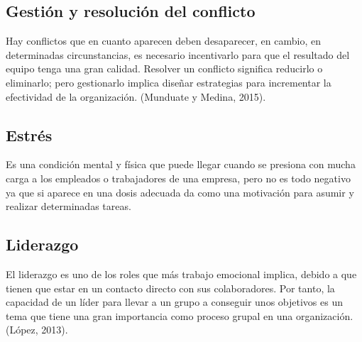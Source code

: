 \subsection{Gestión y resolución del conflicto}
Hay conflictos que en cuanto aparecen deben desaparecer, en cambio, en
determinadas circunstancias, es necesario incentivarlo para que el resultado del
equipo tenga una gran calidad. Resolver un conflicto significa reducirlo o
eliminarlo; pero gestionarlo implica diseñar estrategias para incrementar la
efectividad de la organización. (Munduate y Medina, 2015).
\subsection{Estrés}
Es una condición mental y física que puede llegar cuando se presiona con mucha
carga a los empleados o trabajadores de una empresa, pero no es todo negativo ya
que si aparece en una dosis adecuada da como una motivación para asumir y
realizar determinadas tareas.
\subsection{Liderazgo}
El liderazgo es uno de los roles que más trabajo emocional implica, debido a que
tienen que estar en un contacto directo con sus colaboradores. Por tanto, la
capacidad de un líder para llevar a un grupo a conseguir unos objetivos es un
tema que tiene una gran importancia como proceso grupal en una organización.
(López, 2013).

